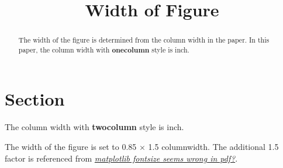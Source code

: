 \documentclass[twocolumn]{aastex631}
\begin{document}
\title{Width of Figure}

\begin{abstract}
    The width of the figure is determined from the column width in the paper.
    In this paper, the column width with \textbf{onecolumn} style is \Convert[unit=in, precision=2, number-only]{\columnwidth} inch.
\end{abstract}

\section*{Section}
The column width with \textbf{twocolumn} style is \Convert[unit=in, precision=2, number-only]{\columnwidth} inch.

The width of the figure is set to 0.85 $\times$ 1.5 columnwidth.
The additional 1.5 factor is referenced from \href{https://stackoverflow.com/questions/71829766/matplotlib-fontsize-seems-wrong-in-pdf}{\textit{matplotlib fontsize seems wrong in pdf?}}.
\end{document}
